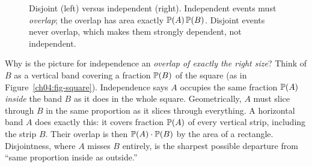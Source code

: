 \begin{figure}[H]
\centering
{}
\vspace{0.9em}
\caption{Disjoint (left) versus independent (right). Independent events must \emph{overlap}; the overlap has area exactly $\P(A)\P(B)$. Disjoint events never overlap, which makes them strongly dependent, not independent.}
\label{ch04:fig-disjoint-vs-indep}
\end{figure}

\begin{whybox}
Why is the picture for independence an \emph{overlap of exactly the right size}? Think of $B$ as a vertical band covering a fraction $\P(B)$ of the square (as in Figure~\ref{ch04:fig-square}). Independence says $A$ occupies the same fraction $\P(A)$ \emph{inside} the band $B$ as it does in the whole square. Geometrically, $A$ must slice through $B$ in the same proportion as it slices through everything. A horizontal band $A$ does exactly this: it covers fraction $\P(A)$ of every vertical strip, including the strip $B$. Their overlap is then $\P(A)\cdot\P(B)$ by the area of a rectangle. Disjointness, where $A$ misses $B$ entirely, is the sharpest possible departure from ``same proportion inside as outside.''
\end{whybox}

